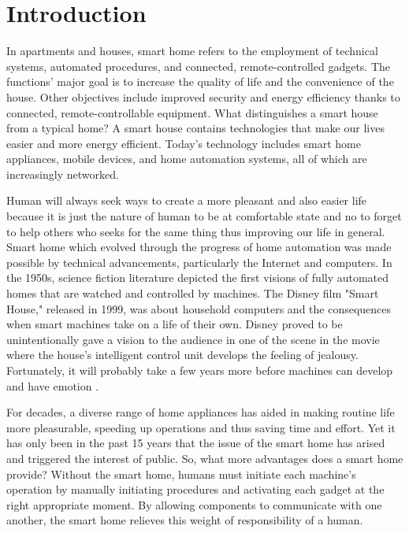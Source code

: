 \section{Introduction}
In apartments and houses, smart home refers to the employment of technical systems, automated procedures, and connected, remote-controlled gadgets. The functions' major goal is to increase the quality of life and the convenience of the house. Other objectives include improved security and energy efficiency thanks to connected, remote-controllable equipment. What distinguishes a smart house from a typical home? A smart house contains technologies that make our lives easier and more energy efficient. Today's technology includes smart home appliances, mobile devices, and home automation systems, all of which are increasingly networked.

Human will always seek ways to create a more pleasant and also easier life because it is just the nature of human to be at comfortable state and no to forget to help others who seeks for the same thing thus improving our life in general. Smart home which evolved through the progress of home automation was made possible by technical advancements, particularly the Internet and computers. In the 1950s, science fiction literature depicted the first visions of fully automated homes that are watched and controlled by machines. The Disney film "Smart House," released in 1999, was about household computers and the consequences when smart machines take on a life of their own. Disney proved to be unintentionally gave a vision to the audience in one of the scene in the movie where the house’s intelligent control unit develops the feeling of jealousy. Fortunately, it will probably take a few years more before machines can develop and have emotion \cite{b1}.

For decades, a diverse range of home appliances has aided in making routine life more pleasurable, speeding up operations and thus saving time and effort. Yet it has only been in the past 15 years that the issue of the smart home has arised and triggered the interest of public. So, what more advantages does a smart home provide? Without the smart home, humans must initiate each machine's operation by manually initiating procedures and activating each gadget at the right appropriate moment. By allowing components to communicate with one another, the smart home relieves this weight of responsibility of a human.

